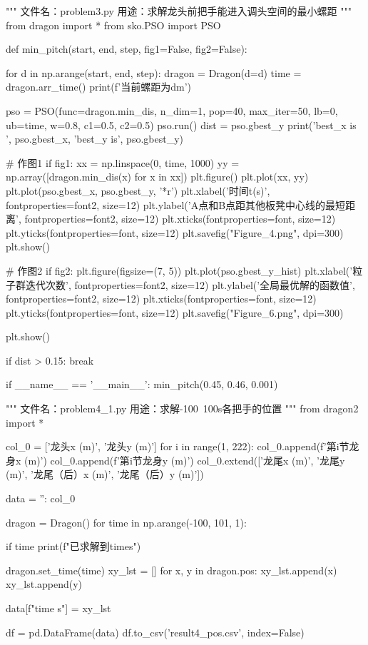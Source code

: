 \documentclass[withoutpreface,bwprint]{cumcmthesis}
\begin{document}
\begin{CodeText}
"""
文件名：problem3.py
用途：求解龙头前把手能进入调头空间的最小螺距
"""
from dragon import *
from sko.PSO import PSO


def min_pitch(start, end, step, fig1=False, fig2=False):

      for d in np.arange(start, end, step):
         dragon = Dragon(d=d)
         time = dragon.arr_time()
         print(f'当前螺距为{d}m')

         pso = PSO(func=dragon.min_dis, n_dim=1, pop=40, max_iter=50, lb=0, ub=time, w=0.8,
                  c1=0.5, c2=0.5)
         pso.run()
         dist = pso.gbest_y
         print('best_x is ', pso.gbest_x, 'best_y is', pso.gbest_y)

         # 作图1
         if fig1:
            xx = np.linspace(0, time, 1000)
            yy = np.array([dragon.min_dis(x) for x in xx])
            plt.figure()
            plt.plot(xx, yy)
            plt.plot(pso.gbest_x, pso.gbest_y, '*r')
            plt.xlabel('时间t(s)', fontproperties=font2, size=12)
            plt.ylabel('A点和B点距其他板凳中心线的最短距离', fontproperties=font2, size=12)
            plt.xticks(fontproperties=font, size=12)
            plt.yticks(fontproperties=font, size=12)
            plt.savefig("Figure_4.png", dpi=300)
            plt.show()

         # 作图2
         if fig2:
            plt.figure(figsize=(7, 5))
            plt.plot(pso.gbest_y_hist)
            plt.xlabel('粒子群迭代次数', fontproperties=font2, size=12)
            plt.ylabel('全局最优解的函数值', fontproperties=font2, size=12)
            plt.xticks(fontproperties=font, size=12)
            plt.yticks(fontproperties=font, size=12)
            plt.savefig("Figure_6.png", dpi=300)

            plt.show()

         if dist > 0.15:
            break


if __name__ == '__main__':
      min_pitch(0.45, 0.46, 0.001)
\end{CodeText}
\begin{CodeText}
"""
文件名：problem4_1.py
用途：求解-100~100s各把手的位置
"""
from dragon2 import *

col_0 = ['龙头x (m)', '龙头y (m)']
for i in range(1, 222):
      col_0.append(f'第{i}节龙身x (m)')
      col_0.append(f'第{i}节龙身y (m)')
col_0.extend(['龙尾x (m)', '龙尾y (m)', '龙尾（后）x (m)', '龙尾（后）y (m)'])

data = {'': col_0}

dragon = Dragon()
for time in np.arange(-100, 101, 1):

      if time %
         print(f"已求解到{time}s")

      dragon.set_time(time)
      xy_lst = []
      for x, y in dragon.pos:
         xy_lst.append(x)
         xy_lst.append(y)

      data[f"{time} s"] = xy_lst

df = pd.DataFrame(data)
df.to_csv('result4_pos.csv', index=False)
\end{CodeText}
\end{document}
